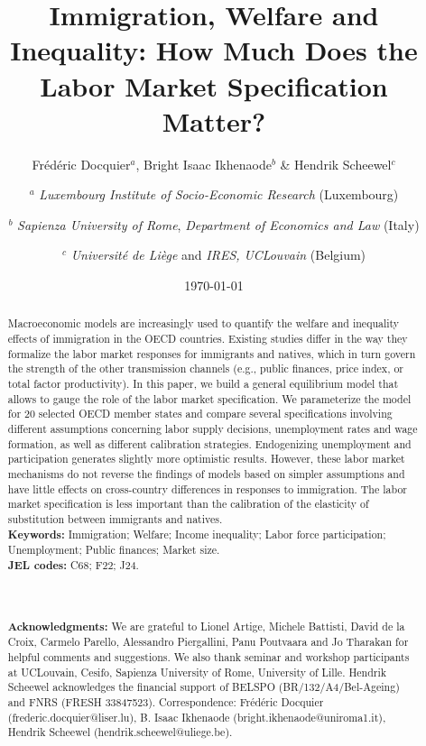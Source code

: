 \documentclass[a4paper,12pt]{article}
\begin{document}
\title{Immigration, Welfare and Inequality: How Much Does the Labor Market Specification Matter?}

\author{Fr\'{e}d\'{e}ric Docquier$^{a}$, Bright Isaac Ikhenaode$^{b}$ \& Hendrik Scheewel$^{c}$ \and 
$^{a}$ {\footnotesize \textit{Luxembourg Institute of Socio-Economic Research} (Luxembourg)} \and $^{b}$ {\footnotesize \textit{Sapienza University of Rome}, \textit{Department of Economics and Law} (Italy)} \and $^{c}$ {\footnotesize \textit{Universit\'{e} de Li\`{e}ge} and \textit{IRES, UCLouvain} (Belgium)}}
\date{\monthyeardate\today}
\maketitle

\begin{abstract}
Macroeconomic models are increasingly used to quantify the welfare and inequality effects of immigration in the OECD countries. Existing studies differ in the way they formalize the labor market responses for immigrants and natives, which in turn govern the strength of the other transmission channels (e.g., public finances, price index, or total factor productivity). In this paper, we build a general equilibrium model that allows to gauge the role of the labor market specification. We parameterize the model for 20 selected OECD member states and compare several specifications involving different assumptions concerning labor supply decisions, unemployment rates and wage formation, as well as different calibration strategies. Endogenizing unemployment and participation generates slightly more optimistic results. However, these labor market mechanisms do not reverse the findings of models based on simpler assumptions and have little effects on cross-country differences in responses to immigration.  The labor market specification is less important than the calibration of the elasticity of substitution between immigrants and natives. \\[0.3cm]
\textbf{Keywords:} Immigration; Welfare; Income inequality; Labor force participation; Unemployment; Public finances; Market size.
\\
\textbf{JEL codes:} C68; F22; J24.
\\
\\
\\
\\
\textbf{Acknowledgments:} We are grateful to Lionel Artige, Michele Battisti, David de la Croix, Carmelo Parello, Alessandro Piergallini, Panu Poutvaara and Jo Tharakan for helpful comments and suggestions. We also thank seminar and workshop participants at UCLouvain, Cesifo, Sapienza University of Rome, University of Lille. Hendrik Scheewel acknowledges the financial support of BELSPO (BR/132/A4/Bel-Ageing) and FNRS (FRESH 33847523). Correspondence: Fr\'{e}d\'{e}ric Docquier (frederic.docquier@liser.lu), B. Isaac Ikhenaode (bright.ikhenaode@uniroma1.it), Hendrik Scheewel (hendrik.scheewel@uliege.be).
\end{abstract}
\end{document}
